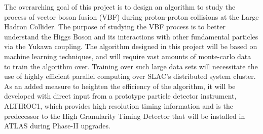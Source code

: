 \documentclass[paper=a4,fontsize=12pt]{article}
\begin{document}
The overarching goal of this project is to design an algorithm to study the process of vector boson fusion (VBF) during proton-proton collisions at the Large Hadron Collider. The purpose of studying the VBF process is to better understand the Higgs Boson and its interactions with other fundamental particles via the Yukawa coupling. The algorithm designed in this project will be based on machine learning techniques, and will require vast amounts of monte-carlo data to train the algorithm over. Training over such large data sets will necessitate the use of highly efficient parallel computing over SLAC's distributed system cluster. As an added measure to heighten the efficiency of the algorithm, it will be developed with direct input from a prototype particle detector instrument, ALTIROC1, which provides high resolution timing information and is the predecessor to the High Granularity Timing Detector that will be installed in ATLAS during Phase-II upgrades.
\end{document}
